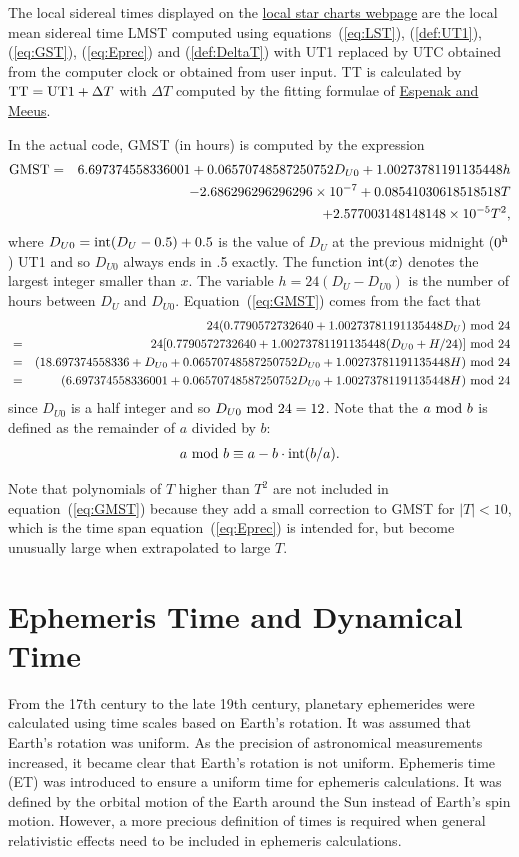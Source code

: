 \documentclass[12pt]{article}
\newcommand \beq {\begin{equation}}
\newcommand \eeq {\end{equation}}
\newcommand \beqn {\begin{eqnarray}}
\newcommand \eeqn {\end{eqnarray}}
\begin{document}
The local sidereal 
times displayed on the \href{../sidereal.html}{local star charts webpage} are the 
local mean sidereal time LMST computed using equations~(\ref{eq:LST}), (\ref{def:UT1}), 
(\ref{eq:GST}), (\ref{eq:Eprec}) and (\ref{def:DeltaT}) with UT1 replaced by UTC 
obtained from the computer clock or obtained from user input. 
TT is calculated by ${\rm TT = UT1}+\Delta T$ 
with $\Delta T$ computed by the fitting formulae of 
\href{https://eclipse.gsfc.nasa.gov/SEcat5/deltatpoly.html}{Espenak and Meeus}.

In the actual code, GMST (in hours) is computed by the expression 
\beqn
  {\rm GMST} &=& 6.697374558336001 + 0.06570748587250752 D_{U0} 
+ 1.00273781191135448 h \cr 
&& - 2.686296296296296\times 10^{-7} + 0.08541030618518518 T \cr 
&& + 2.577003148148148\times 10^{-5} T^2 ,
\label{eq:GMST}
\eeqn
where $D_{U0} = {\rm int}(D_U - 0.5) + 0.5$ is the value of $D_U$ at the previous 
midnight ($0^{\rm h}$) UT1 and so $D_{U0}$ always ends in .5 exactly. The function 
${\rm int}(x)$ denotes the largest integer smaller than $x$. The variable 
$h=24(D_U-D_{U0})$ 
is the number of hours between $D_U$ and $D_{U0}$. Equation~(\ref{eq:GMST}) comes 
from the fact that
\beqn
  && 24(0.7790572732640 + 1.00273781191135448 D_U)~{\rm mod}~24 \cr
&=& 24[0.7790572732640 + 1.00273781191135448 (D_{U0}+H/24)]~{\rm mod}~24 \cr
&=& (18.697374558336 + D_{U0} + 0.06570748587250752 D_{U0} + 
1.00273781191135448 H)~{\rm mod}~24 \cr
&=& (6.697374558336001 + 0.06570748587250752 D_{U0} + 
1.00273781191135448 H)~{\rm mod}~24 
\eeqn
since $D_{U0}$ is a half integer and so $D_{U0}~{\rm mod}~24=12$. Note that 
the $a~{\rm mod}~b$ is defined as the remainder of $a$ divided by $b$:
\beq
  a~{\rm mod}~b \equiv a - b \cdot {\rm int}(b/a) .
\eeq

Note that polynomials of $T$ higher than $T^2$ are not included in 
equation~(\ref{eq:GMST}) because they add a small correction to 
GMST for $|T|<10$, which is the time span equation~(\ref{eq:Eprec}) is intended for, 
but become unusually large when extrapolated to large $T$.

\section{Ephemeris Time and Dynamical Time}
\label{sec:ET}

From the 17th century to the late 19th century, planetary ephemerides 
were calculated using time scales based on Earth's rotation. It was 
assumed that Earth's rotation was uniform. As the precision of astronomical 
measurements increased, it became clear that Earth's rotation is not uniform. 
Ephemeris time (ET) was introduced to ensure a uniform time for ephemeris calculations.
It was defined by the orbital motion of the Earth 
around the Sun instead of Earth's spin motion. However, a more precious 
definition of times is required when general relativistic effects need to be included 
in ephemeris calculations.
\end{document}
